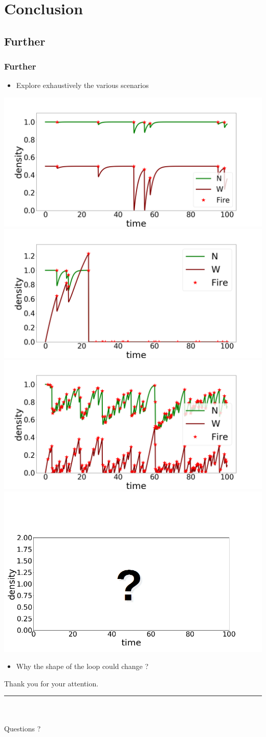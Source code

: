 \documentclass{beamer}
\begin{document}
\section{Conclusion}



\subsection{Further}
\begin{frame}
\frametitle{Further}
\begin{itemize}
    \item Explore exhaustively the various scenarios
\end{itemize}
\includegraphics[width=4.cm]{1.png}
\includegraphics[width=4.cm]{2.png} \\
\includegraphics[width=4.cm]{3.png}
\includegraphics[width=4.cm]{4_point.png}

\begin{itemize}
    \item Why the shape of the loop could change ? %
\end{itemize}

\end{frame}





\begin{frame}

\begin{center}
Thank you for your attention.
\\
[0.4cm]
\textcolor{red}{\rule{\linewidth}{0.5mm}} \\ 
[0.4cm]
\\
Questions ?
\end{center}

\end{frame}
\end{document}
